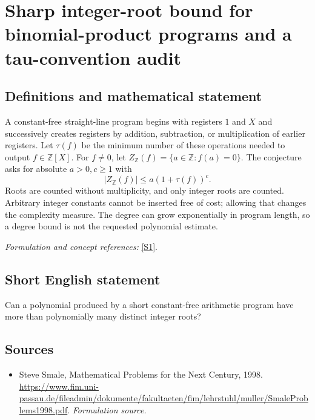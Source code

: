 \documentclass[11pt]{article}
\begin{document}
\section*{\texorpdfstring{Sharp integer-root bound for binomial-product programs and a tau-convention audit}{Sharp integer-root bound for binomial-product programs and a tau-convention audit}}\label{statement}
\subsection{Definitions and mathematical statement}
A constant-free straight-line program begins with registers $1$ and $X$ and successively creates registers by addition, subtraction, or multiplication of earlier registers. Let $\tau(f)$ be the minimum number of these operations needed to output $f\in{\mathbb{Z}}[X]$. For $f\ne0$, let $Z_{{\mathbb{Z}}}(f)=\{a\in{\mathbb{Z}}:f(a)=0\}$. The conjecture asks for absolute $a>0,c\ge1$ with
\[
 |Z_{{\mathbb{Z}}}(f)|\le a(1+\tau(f))^c.
\]
Roots are counted without multiplicity, and only integer roots are counted. Arbitrary integer constants cannot be inserted free of cost; allowing that changes the complexity measure. The degree can grow exponentially in program length, so a degree bound is not the requested polynomial estimate.
\par\smallskip\textit{Formulation and concept references:} \href{https://www.fim.uni-passau.de/fileadmin/dokumente/fakultaeten/fim/lehrstuhl/muller/SmaleProblems1998.pdf}{[S1]}.

\subsection{Short English statement}
Can a polynomial produced by a short constant-free arithmetic program have more than polynomially many distinct integer roots?
\subsection{Sources}
\begin{itemize}
\item[S1]Steve Smale, Mathematical Problems for the Next Century, 1998.
\url{https://www.fim.uni-passau.de/fileadmin/dokumente/fakultaeten/fim/lehrstuhl/muller/SmaleProblems1998.pdf}.
\textit{Formulation source.}
\end{itemize}
\end{document}

